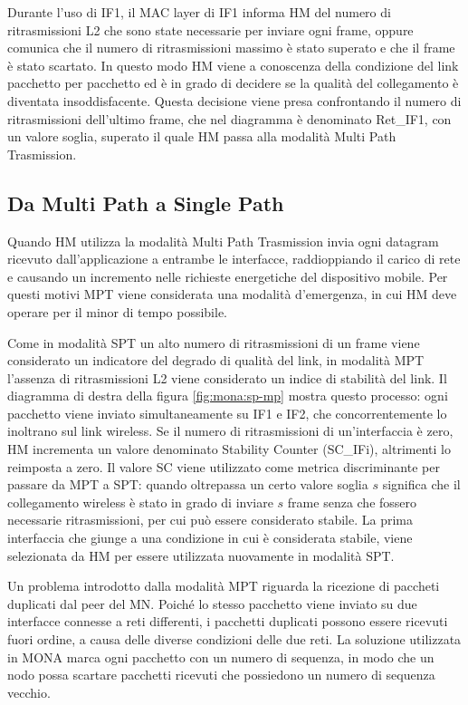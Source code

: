 \documentclass[12pt,a4paper,openright,twoside,draft]{book}
\begin{document}
Durante l'uso di IF1, il MAC layer di IF1 informa HM del numero di
ritrasmissioni L2 che sono state necessarie per inviare ogni frame,
oppure comunica che il numero di ritrasmissioni massimo è stato
superato e che il frame è stato scartato. In questo modo HM viene a
conoscenza della condizione del link pacchetto per pacchetto ed è in
grado di decidere se la qualità del collegamento è diventata
insoddisfacente. Questa decisione viene presa confrontando il numero
di ritrasmissioni dell'ultimo frame, che nel diagramma è denominato
Ret\_IF1, con un valore soglia, superato il quale HM passa alla
modalità Multi Path Trasmission.

\subsection{Da Multi Path a Single Path}

Quando HM utilizza la modalità Multi Path Trasmission invia ogni
datagram ricevuto dall'applicazione a entrambe le interfacce,
raddioppiando il carico di rete e causando un incremento nelle
richieste energetiche del dispositivo mobile. Per questi motivi MPT
viene considerata una modalità d'emergenza, in cui HM deve operare per
il minor di tempo possibile.

Come in modalità SPT un alto numero di ritrasmissioni di un frame
viene considerato un indicatore del degrado di qualità del link, in
modalità MPT l'assenza di ritrasmissioni L2 viene considerato un
indice di stabilità del link. Il diagramma di destra della figura
\ref{fig:mona:sp-mp} mostra questo processo: ogni pacchetto viene
inviato simultaneamente su IF1 e IF2, che concorrentemente lo
inoltrano sul link wireless. Se il numero di ritrasmissioni di
un'interfaccia è zero, HM incrementa un valore denominato Stability
Counter (SC\_IFi), altrimenti lo reimposta a zero. Il valore SC viene
utilizzato come metrica discriminante per passare da MPT a SPT: quando
oltrepassa un certo valore soglia $s$ significa che il collegamento
wireless è stato in grado di inviare $s$ frame senza che fossero
necessarie ritrasmissioni, per cui può essere considerato stabile. La
prima interfaccia che giunge a una condizione in cui è considerata
stabile, viene selezionata da HM per essere utilizzata nuovamente in
modalità SPT.

Un problema introdotto dalla modalità MPT riguarda la ricezione di
paccheti duplicati dal peer del MN. Poiché lo stesso pacchetto viene
inviato su due interfacce connesse a reti differenti, i pacchetti
duplicati possono essere ricevuti fuori ordine, a causa delle diverse
condizioni delle due reti. La soluzione utilizzata in MONA marca ogni
pacchetto con un numero di sequenza, in modo che un nodo possa
scartare pacchetti ricevuti che possiedono un numero di sequenza
vecchio.
\end{document}
